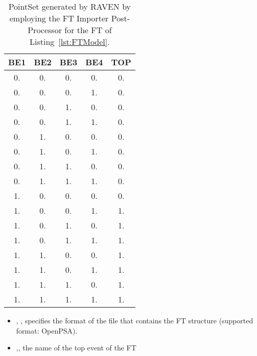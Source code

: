 \begin{table}[h]
    \centering
    \caption{PointSet generated by RAVEN by employing the FT Importer Post-Processor for the FT of Listing~\ref{lst:FTModel}.}
    \label{PointSetFT}
	\begin{tabular}{c | c | c | c | c}
		\hline
		BE1 & BE2 & BE3 & BE4 & TOP \\
		\hline
		 0. &  0. &  0. &  0. &  0. \\
		 0. &  0. &  0. &  1. &  0. \\
		 0. &  0. &  1. &  0. &  0. \\
		 0. &  0. &  1. &  1. &  0. \\
		 0. &  1. &  0. &  0. &  0. \\
		 0. &  1. &  0. &  1. &  0. \\
		 0. &  1. &  1. &  0. &  0. \\
		 0. &  1. &  1. &  1. &  0. \\
		 1. &  0. &  0. &  0. &  0. \\
		 1. &  0. &  0. &  1. &  1. \\
		 1. &  0. &  1. &  0. &  1. \\
		 1. &  0. &  1. &  1. &  1. \\
		 1. &  1. &  0. &  0. &  1. \\
		 1. &  1. &  0. &  1. &  1. \\
		 1. &  1. &  1. &  0. &  1. \\
		 1. &  1. &  1. &  1. &  1. \\
		\hline
	\end{tabular}
\end{table}

%
%
\begin{itemize}
  \item {}, , specifies the format of the file that contains the
    FT structure (supported format: OpenPSA).
  \item  {},, the name of the top event of the FT
\end{itemize}

